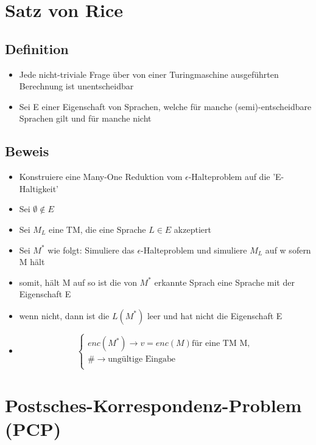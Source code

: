 \documentclass[12pt,a4paper]{article}
\begin{document}
\section{Satz von Rice}

\subsection{Definition}
\begin{itemize}
\item Jede nicht-triviale Frage über von einer Turingmaschine ausgeführten Berechnung ist unentscheidbar
\item Sei E einer Eigenschaft von Sprachen, welche für manche (semi)-entscheidbare Sprachen gilt und für manche nicht
\end{itemize}
\subsection{Beweis}
\begin{itemize}
\item Konstruiere eine Many-One Reduktion vom $\epsilon$-Halteproblem auf die 'E-Haltigkeit'
\item Sei $\emptyset \not\in E$
\item Sei $M_L$ eine TM, die eine Sprache $L \in E$ akzeptiert
\item Sei $M^*$ wie folgt: Simuliere das $\epsilon$-Halteproblem und simuliere $M_L$ auf w sofern M hält
\item somit, hält M auf so ist die von $M^*$ erkannte Sprach eine Sprache mit der Eigenschaft E
\item wenn nicht, dann ist die $L(M^*)$ leer und hat nicht die Eigenschaft E
\item $$
\begin{cases}
enc(M^*) \rightarrow v = enc(M) \text{für eine TM M},\\
\# \rightarrow \text{ungültige Eingabe}\\
\end{cases}
$$
\end{itemize}

\section{Postsches-Korrespondenz-Problem (PCP)}
\end{document}
